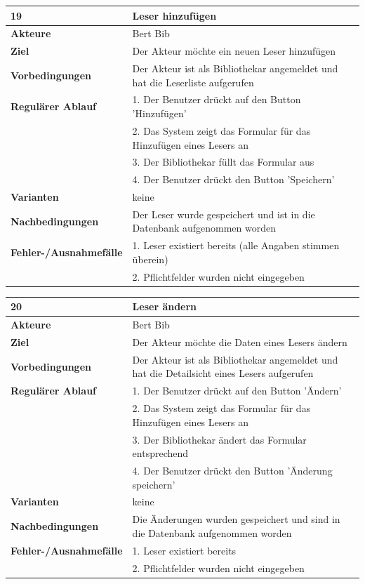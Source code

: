 \documentclass[fontsize=12pt,paper=a4,twoside]{scrartcl}
\begin{document}
\begin{table}[htbp]
\label{19}
\begin{tabular}{|l|p{10cm}|}
\hline 
\textbf{19} & \textbf{Leser hinzufügen} \\ \hline
\textbf{Akteure} & Bert Bib\\ \hline
\textbf{Ziel} & Der Akteur möchte ein neuen Leser hinzufügen \\ \hline
\textbf{Vorbedingungen} & Der Akteur ist als Bibliothekar angemeldet und hat die Leserliste aufgerufen\\
\hline
\textbf{Regulärer Ablauf} & 
1. Der Benutzer drückt auf den Button 'Hinzufügen' \\
&2. Das System zeigt das Formular für das Hinzufügen eines Lesers an\\
&3. Der Bibliothekar füllt das Formular aus\\
&4. Der Benutzer drückt den Button 'Speichern'\\
\hline
\textbf{Varianten} & 
keine \\ \hline
\textbf{Nachbedingungen} & Der Leser wurde gespeichert und ist in die Datenbank aufgenommen 
worden\\ \hline
\textbf{Fehler-/Ausnahmefälle} & 1. Leser existiert bereits (alle Angaben stimmen überein)\\
&2. Pflichtfelder wurden nicht eingegeben\\
\hline
\end{tabular}
\end{table}

\begin{table}[htbp]
\label{20}
\begin{tabular}{|l|p{10cm}|}
\hline 
\textbf{20} & \textbf{Leser ändern} \\ \hline
\textbf{Akteure} & Bert Bib\\ \hline
\textbf{Ziel} & Der Akteur möchte die Daten eines Lesers ändern \\ \hline
\textbf{Vorbedingungen} & Der Akteur ist als Bibliothekar angemeldet und hat die Detailsicht eines 
Lesers aufgerufen  \\ \hline
\textbf{Regulärer Ablauf} & 
1. Der Benutzer drückt auf den Button 'Ändern' \\
&2. Das System zeigt das Formular für das Hinzufügen eines Lesers an\\
&3. Der Bibliothekar ändert das Formular entsprechend\\
&4. Der Benutzer drückt den Button 'Änderung speichern'\\
\hline
\textbf{Varianten} & 
keine \\ \hline
\textbf{Nachbedingungen} & Die Änderungen wurden gespeichert und sind in die Datenbank 
aufgenommen worden\\ \hline
\textbf{Fehler-/Ausnahmefälle} & 1. Leser existiert bereits\\
&2. Pflichtfelder wurden nicht eingegeben\\
\hline
\end{tabular}
\end{table}
\end{document}

